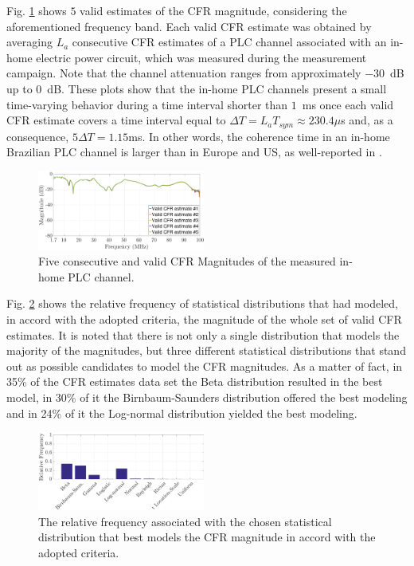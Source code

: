 \documentclass[journal]{IEEEtran}
\begin{document}
Fig. \ref{respfreq} shows $5$ valid estimates of the \ac{CFR} magnitude, considering the aforementioned frequency band. Each valid \ac{CFR} estimate was obtained by averaging  $L_a$ consecutive \ac{CFR} estimates of a \ac{PLC} channel associated with an in-home electric power circuit, which was measured during the measurement campaign. Note that the channel attenuation ranges from approximately $-30$~dB up to $0$~dB. These plots show that the in-home \ac{PLC} channels present a small time-varying behavior during a time interval shorter than $1$~ms once each valid \ac{CFR} estimate covers a time interval equal to $\Delta T = L_a T_{sym} \approx 230.4\mu$s and, as a consequence, $5\Delta T = 1.15$ms. In other words, the coherence time in an in-home Brazilian PLC channel is larger than in Europe and US, as well-reported in \cite{Thiago:Characterization}.

\begin{figure}[h]
	\centering
	\includegraphics[width=0.49\textwidth]{images/respfreq_1.7.eps}
	\caption{Five consecutive and valid \ac{CFR} Magnitudes of the measured in-home \ac{PLC} channel.}
	\label{respfreq}
\end{figure}

Fig. \ref{MAG_percent} shows the relative frequency of statistical distributions that had modeled, in accord with the adopted criteria, the magnitude of the whole set of valid \ac{CFR} estimates. It is noted that there is not only a single distribution that models the majority of the magnitudes, but three different statistical distributions that stand out as possible candidates to model the \ac{CFR} magnitudes. As a matter of fact, in 35\% of the \ac{CFR} estimates data set the Beta distribution resulted in the best model, in 30\% of it  the Birnbaum-Saunders distribution offered the best modeling and in 24\% of it the Log-normal distribution yielded the best modeling. 

\begin{figure}[h!]
	\centering
	\includegraphics[width=0.49\textwidth]{images/Mag_percent.eps}
	\caption{The relative frequency associated with the chosen statistical distribution that best models the \ac{CFR} magnitude in accord with the adopted criteria.}
	\label{MAG_percent}
\end{figure}
\end{document}
